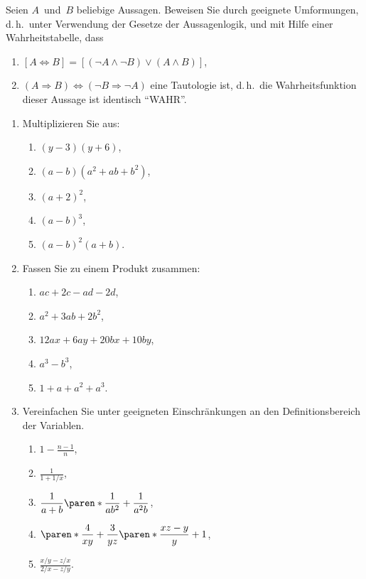 \documentclass[a4paper]{article}
\begin{document}
\begin{problem}[B01.A3]
Seien $A$~und~$B$ beliebige Aussagen. Beweisen Sie durch geeignete Umformungen, d.\,h.\ unter Verwendung der Gesetze der Aussagenlogik, und mit Hilfe einer Wahrheitstabelle, dass
\begin{enumerate}
    \item $[A \Leftrightarrow B] = [(\neg A \wedge \neg B) \vee (A \wedge B)]$,
    \item $(A \Rightarrow B) \Leftrightarrow (\neg B \Rightarrow \neg A)$ eine Tautologie ist, d.\,h.\ die Wahrheitsfunktion dieser Aussage ist identisch "`WAHR"'.
\end{enumerate}
\end{problem}

\begin{problem}[B01.P1]\leavevmode
\begin{enumerate}
    \item Multiplizieren Sie aus:
          \begin{enumerate}
              \item $(y-3) (y+6)$,
              \item $(a-b) (a^2 + ab + b^2)$,
              \item $(a+2)^2$,
              \item $(a-b)^3$,
              \item $(a-b)^2 (a+b)$.
          \end{enumerate}
    \item Fassen Sie zu einem Produkt zusammen:
          \begin{enumerate}
              \item $ac + 2c - ad - 2d$,
              \item $a^2 + 3ab + 2b^2$,
              \item $12ax + 6ay + 20bx + 10by$,
              \item $a^3 - b^3$,
              \item $1 + a + a^2 + a^3$.
          \end{enumerate}
    \item Vereinfachen Sie unter geeigneten Einschränkungen an den Definitionsbereich der Variablen.
          \begin{enumerate}
              \item $\displaystyle 1-\frac{n-1}{n}$,
              \item $\displaystyle \frac{1}{1 + 1/x}$,
              \item $\displaystyle \frac{1}{a+b} \paren*{\frac{1}{ab^2} + \frac{1}{a^2b}}$,
              \item $\displaystyle \paren*{\frac{4}{xy} + \frac{3}{yz}} \paren*{\frac{xz-y}{y} + 1}$,
              \item $\displaystyle \frac{x/y - z/x}{2/x - z/y}$.
          \end{enumerate}
\end{enumerate}
\end{problem}
\end{document}
